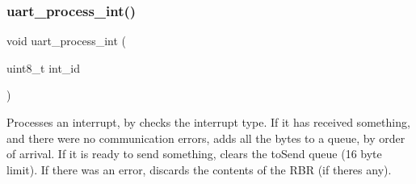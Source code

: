\subsubsection{\texorpdfstring{uart\+\_\+process\+\_\+int()}{uart\_process\_int()}}
{\footnotesize\ttfamily void uart\+\_\+process\+\_\+int (\begin{DoxyParamCaption}\item[{uint8\+\_\+t}]{int\+\_\+id }\end{DoxyParamCaption})}



Processes an interrupt, by checks the interrupt type. If it has received something, and there were no communication errors, adds all the bytes to a queue, by order of arrival. If it is ready to send something, clears the to\+Send queue (16 byte limit). If there was an error, discards the contents of the R\+BR (if there\textquotesingle{}s any). 


